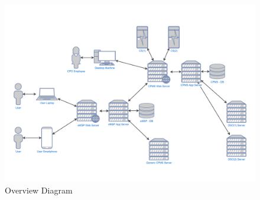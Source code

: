 \documentclass[11pt]{article}
\begin{document}
\begin{figure}[!ht]
    \centering
    \includegraphics[page={1}, trim=1cm 1.25cm 1cm 1.25cm, width=\linewidth, clip]{OverviewDiagram.pdf}
    \caption{Overview Diagram}
\end{figure}
\end{document}
